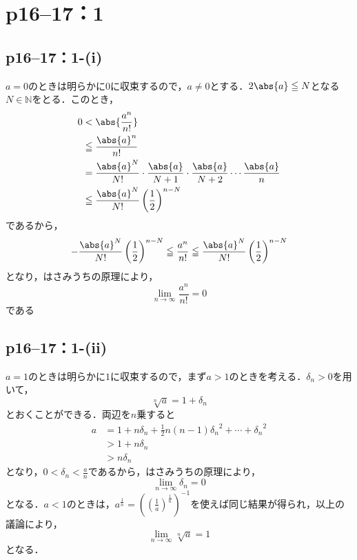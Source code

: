 \documentclass[a4paper,10pt,fleqn]{ltjsarticle}
\begin{document}
\section*{p16--17：1}

\subsection*{p16--17：1-(i)}

\begin{tleftbar}
    $a=0$のときは明らかに$0$に収束するので，$a \ne 0$とする．$2\abs{a} \le N$となる$N \in \mathbb{N}$をとる．このとき，
    \begin{align*}
        0 & < \abs{ \frac{a^n}{n!} }                                                                              \\
          & \le \frac{\abs{a}^n}{n!}                                                                              \\
          & = \frac{\abs{a}^{N}}{N!} \cdot \frac{\abs{a}}{N+1} \cdot \frac{\abs{a}}{N+2} \dotsm \frac{\abs{a}}{n} \\
          & \le  \frac{\abs{a}^{N}}{N!} \left(\frac{1}{2} \right)^{n-N}
    \end{align*}
    であるから，
    \[
        - \frac{\abs{a}^{N}}{N!} \left(\frac{1}{2} \right)^{n-N} \le  \frac{a^n}{n!} \le \frac{\abs{a}^{N}}{N!} \left(\frac{1}{2} \right)^{n-N}
    \]
    となり，はさみうちの原理により，
    \[
        \lim_{n \to \infty} \frac{a^n}{n!} =0
    \]
    である
\end{tleftbar}

\subsection*{p16--17：1-(ii)}

\begin{tleftbar}
    $a=1$のときは明らかに$1$に収束するので，まず$a>1$のときを考える．$\delta_n >0$を用いて，
    \[
        \sqrt[n]{a} =1+\delta_n
    \]
    とおくことができる．両辺を$n$乗すると
    \begin{align*}
        a & = 1+ n \delta_n + \frac{1}{2}n(n-1) {\delta_n}^2 + \cdots + {\delta_n}^2 \\
          & >1+n \delta_n                                                            \\
          & >n \delta_n
    \end{align*}
    となり，$0<\delta_n <\frac{a}{n}$であるから，はさみうちの原理により，
    \[
        \lim_{n \to \infty} \delta_n =0
    \]
    となる．$a<1$のときは，$a^{\frac{1}{n}}=\left(\left(\frac{1}{a}\right)^{\frac{1}{n}}\right)^{-1}$を使えば同じ結果が得られ，以上の議論により，
    \[
        \lim_{n \to \infty} \sqrt[n]{a} =1
    \]
    となる．
\end{tleftbar}
\end{document}
